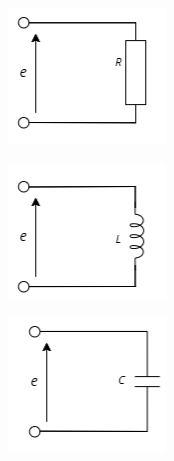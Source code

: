 \documentclass[twocolumn]{article}
\begin{document}
\begin{enumerate}
    \begin{center}
      \includegraphics[width=0.6\linewidth]{./Circuits/Circuits_a.png}
    \end{center}
    \begin{center}
      \includegraphics[width=0.6\linewidth]{./Circuits/Circuits_b.png}
    \end{center}
    \begin{center}
      \includegraphics[width=0.6\linewidth]{./Circuits/Circuits_c.png}
    \end{center}


\end{enumerate}
\end{document}
